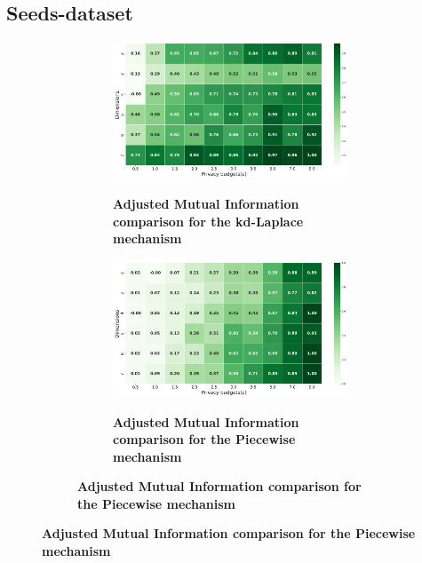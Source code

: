 {\subsection{Seeds-dataset}
\begin{figure}[H]
  \centering
  \begin{subfigure}[b]{0.8\textwidth}
    \begin{subfigure}[c]{1\textwidth}
      \caption{\textbf{Adjusted Mutual Information comparison for the kd-Laplace mechanism}}
      \includegraphics[width=1\textwidth]{Results/nd-laplace/nd-Laplace/seeds-dataset/ami.png}
      \label{fig:ami_seeds-dataset_comparison_kdlaplace_2d}
    \end{subfigure}
    \vfill %
    \begin{subfigure}[c]{1\textwidth}
      \caption{\textbf{Adjusted Mutual Information comparison for the Piecewise mechanism}}
      \includegraphics[width=1\textwidth]{Results/nd-laplace/piecewise/seeds-dataset/ami.png}
      \label{fig:ami_seeds-dataset_comparison_piecewise_2d}
    \end{subfigure}
  \end{subfigure}
  

\end{figure}}
